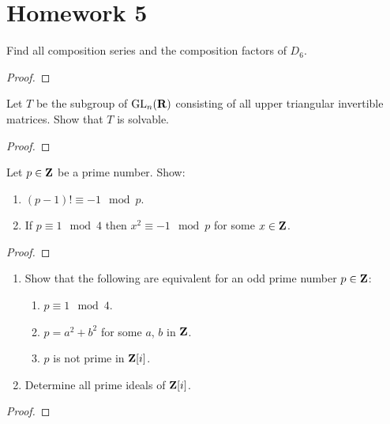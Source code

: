 \chapter{Homework 5}
\begin{problem}
Find all composition series and the composition factors of $D_6$.
\end{problem}
\begin{proof}
\end{proof}

\begin{problem}
Let $T$ be the subgroup of $\mathrm{GL}_n(\mathbf{R})$ consisting of all upper triangular
invertible matrices. Show that $T$ is solvable.
\end{problem}
\begin{proof}
\end{proof}

\begin{problem}
Let $p\in\mathbf{Z}$ be a prime number. Show:
\begin{enumerate}[label=(\alph*)]
\item $(p-1)!\equiv -1\mod{p}$.
\item If $p\equiv 1\mod{4}$ then $x^2\equiv -1\mod{p}$ for some
  $x\in\mathbf{Z}$.
\end{enumerate}
\end{problem}
\begin{proof}
\end{proof}

\begin{problem}
\begin{enumerate}[label=(\alph*)]
\item Show that the following are equivalent for an odd prime number
  $p\in\mathbf{Z}$:
  \begin{enumerate}[label=(\roman*)]
  \item $p\equiv 1\mod 4$.
  \item $p=a^2+b^2$ for some $a$, $b$ in $\mathbf{Z}$.
  \item $p$ is not prime in $\mathbf{Z}[i]$.
  \end{enumerate}
\item Determine all prime ideals of $\mathbf{Z}[i]$.
\end{enumerate}
\end{problem}
\begin{proof}
\end{proof}

